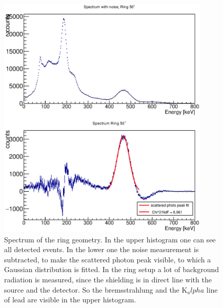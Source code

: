 \documentclass{article}
\begin{document}
\begin{figure}[H]
    \centering
    \includegraphics[width=0.9\textwidth]{Graphen/compton_spektren/50grad.eps}
    \caption{Spectrum of the ring geometry. In the upper histogram one can see all detected events.
    In the lower one the noise measurement is subtracted, to make the scattered photon peak visible, to which a Gaussian distribution is fitted. In the ring setup a lot of background radiation is measured, since the shielding is in direct line with the source and the detector. So the bremsstrahlung and the K$_alpha$ line of lead are visible in the upper histogram.}
\end{figure}
\end{document}
